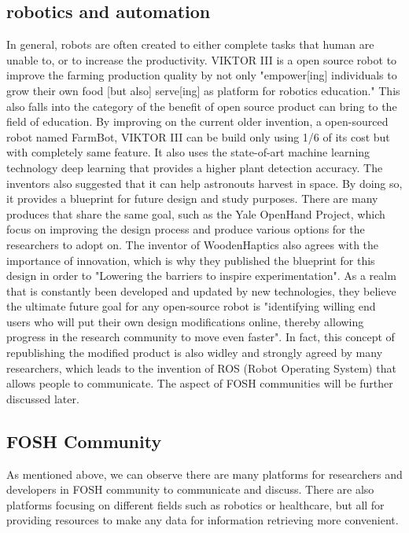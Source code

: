 \documentclass[acmtog]{acmart}
\begin{document}
\subsection{robotics and automation}
In general, robots are often created to either complete tasks that human are unable to, or to increase the productivity. VIKTOR III is a open source robot to improve the farming production quality by not only "empower[ing] individuals to grow their own food [but also] serve[ing] as platform for robotics education." This also falls into the category of the benefit of open source product can bring to the field of education. By improving on the current older invention, a open-sourced robot named FarmBot, VIKTOR III can be build only using 1/6 of its cost but with completely same feature. It also uses the state-of-art machine learning technology deep learning that provides a higher plant detection accuracy. The inventors also suggested that it can help astronouts harvest in space. By doing so, it provides a blueprint for future design and study purposes. There are many produces that share the same goal, such as the Yale OpenHand Project, which focus on improving the design process and produce various options for the researchers to adopt on.  The inventor of WoodenHaptics also agrees with the importance of innovation, which is why they published the blueprint for this design in order to "Lowering the barriers to inspire experimentation". As a realm that is constantly been developed and updated by new technologies, they believe the ultimate future goal for any open-source robot is "identifying willing end users who will put their own design modifications online, thereby allowing progress in the research community to move even faster". In fact, this concept of republishing the modified product is also widley and strongly agreed by many researchers, which leads to the invention of ROS (Robot Operating System) that allows people to communicate. The aspect of FOSH communities will be further discussed later. 


\subsection{FOSH Community}
As mentioned above, we can observe there are many platforms for researchers and developers in FOSH community to communicate and discuss. There are also platforms focusing on different fields such as robotics or healthcare, but all for providing resources to make any data for information retrieving  more convenient. 
\end{document}
